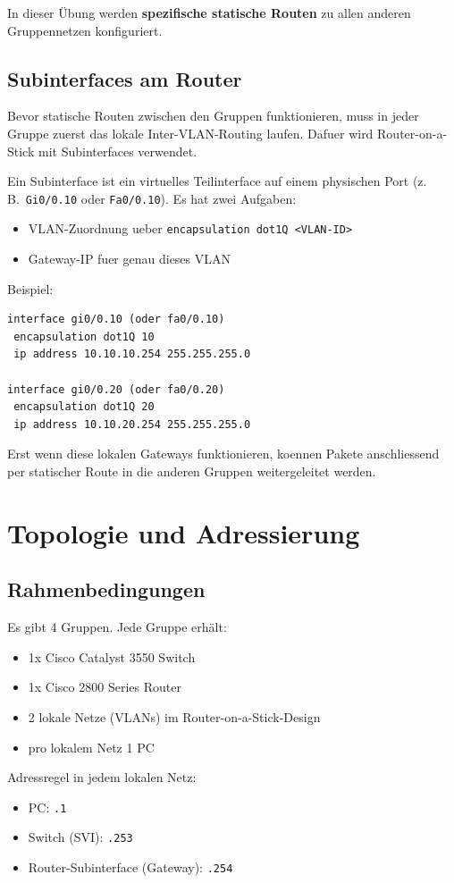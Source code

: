 \documentclass[11pt, oneside, numbers=noenddot]{scrbook}
\begin{document}
In dieser Übung werden \textbf{spezifische statische Routen} zu allen anderen Gruppennetzen konfiguriert.

\section{Subinterfaces am Router}
Bevor statische Routen zwischen den Gruppen funktionieren, muss in jeder Gruppe zuerst das lokale Inter-VLAN-Routing laufen. Dafuer wird Router-on-a-Stick mit Subinterfaces verwendet.

Ein Subinterface ist ein virtuelles Teilinterface auf einem physischen Port (z.\,B.\ \texttt{Gi0/0.10} oder \texttt{Fa0/0.10}). Es hat zwei Aufgaben:
\begin{itemize}
\item VLAN-Zuordnung ueber \texttt{encapsulation dot1Q <VLAN-ID>}
\item Gateway-IP fuer genau dieses VLAN
\end{itemize}

Beispiel:
\begin{verbatim}
interface gi0/0.10 (oder fa0/0.10)
 encapsulation dot1Q 10
 ip address 10.10.10.254 255.255.255.0

interface gi0/0.20 (oder fa0/0.20)
 encapsulation dot1Q 20
 ip address 10.10.20.254 255.255.255.0
\end{verbatim}
Erst wenn diese lokalen Gateways funktionieren, koennen Pakete anschliessend per statischer Route in die anderen Gruppen weitergeleitet werden.

\chapter{Topologie und Adressierung}
\section{Rahmenbedingungen}
Es gibt 4 Gruppen. Jede Gruppe erhält:
\begin{itemize}
\item 1x Cisco Catalyst 3550 Switch
\item 1x Cisco 2800 Series Router
\item 2 lokale Netze (VLANs) im Router-on-a-Stick-Design
\item pro lokalem Netz 1 PC
\end{itemize}

Adressregel in jedem lokalen Netz:
\begin{itemize}
\item PC: \texttt{.1}
\item Switch (SVI): \texttt{.253}
\item Router-Subinterface (Gateway): \texttt{.254}
\end{itemize}
\end{document}
